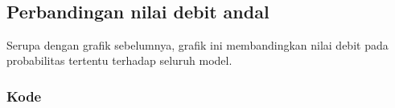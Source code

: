 \documentclass[11pt]{article}
\begin{document}
    \begin{center}
    \end{center}
    { \hspace*{\fill} \\}
    
    \hypertarget{perbandingan-nilai-debit-andal}{%
\subsection{Perbandingan nilai debit
andal}\label{perbandingan-nilai-debit-andal}}

Serupa dengan grafik sebelumnya, grafik ini membandingkan nilai debit
pada probabilitas tertentu terhadap seluruh model.

    \hypertarget{kode}{%
\subsubsection{Kode}\label{kode}}
\end{document}
